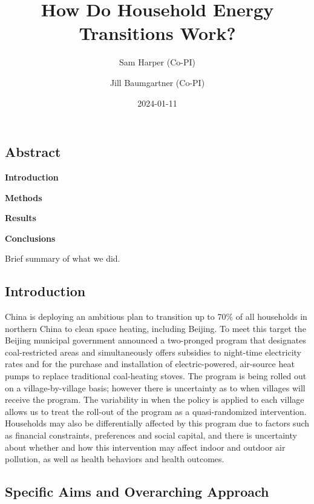 \documentclass[
  letterpaper,
  DIV=11,
  numbers=noendperiod]{scrartcl}
\title{How Do Household Energy Transitions Work?}
\author{Sam Harper (Co-PI) \and Jill Baumgartner (Co-PI)}
\date{2024-01-11}
\renewcommand*\contentsname{Table of contents}
\newcommand\contentsname{Table of contents}
\begin{document}
\maketitle
\ifdefined\Shaded\renewenvironment{Shaded}{\begin{tcolorbox}[interior hidden, sharp corners, enhanced, borderline west={3pt}{0pt}{shadecolor}, boxrule=0pt, breakable, frame hidden]}{\end{tcolorbox}}\fi

\renewcommand*\contentsname{Table of contents}
{
\hypersetup{linkcolor=}
\setcounter{tocdepth}{3}
\tableofcontents
}
\hypertarget{abstract}{%
\subsection{Abstract}\label{abstract}}

\textbf{Introduction}

\textbf{Methods}

\textbf{Results}

\textbf{Conclusions}

Brief summary of what we did.

\hypertarget{introduction}{%
\subsection{Introduction}\label{introduction}}

China is deploying an ambitious plan to transition up to 70\% of all
households in northern China to clean space heating, including Beijing.
To meet this target the Beijing municipal government announced a
two-pronged program that designates coal-restricted areas and
simultaneously offers subsidies to night-time electricity rates and for
the purchase and installation of electric-powered, air-source heat pumps
to replace traditional coal-heating stoves. The program is being rolled
out on a village-by-village basis; however there is uncertainty as to
when villages will receive the program. The variability in when the
policy is applied to each village allows us to treat the roll-out of the
program as a quasi-randomized intervention. Households may also be
differentially affected by this program due to factors such as financial
constraints, preferences and social capital, and there is uncertainty
about whether and how this intervention may affect indoor and outdoor
air pollution, as well as health behaviors and health outcomes.

\hypertarget{specific-aims-and-overarching-approach}{%
\subsection{Specific Aims and Overarching
Approach}\label{specific-aims-and-overarching-approach}}
\end{document}
